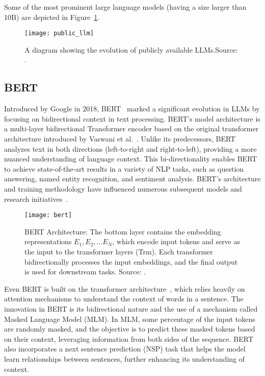 Some of the most prominent large language models (having a size larger than 10B) are depicted in Figure~\ref{fig:llm-evolution}.

\begin{figure}[h!]
    \centering
    \texttt{[image: public\_llm]}
    \caption{A diagram showing the evolution of publicly available LLMs.Source: \protect\cite{survey}.}
    \label{fig:llm-evolution}
\end{figure}

\subsection{BERT}
\label{subsec:bert}

Introduced by Google in 2018, BERT~\cite{bert} marked a significant evolution in LLMs by focusing on bidirectional context in text processing.
BERT’s model architecture is a multi-layer bidirectional Transformer encoder based on the original transformer architecture introduced by Vaswani et al.~\cite{vaswani2023attention}.
Unlike its predecessors, BERT analyzes text in both directions (left-to-right and right-to-left), providing a more nuanced understanding of language context.
This bi-directionality enables BERT to achieve state-of-the-art results in a variety of NLP tasks, such as question answering, named entity recognition, and sentiment analysis.
BERT's architecture and training methodology have influenced numerous subsequent models and research initiatives~\cite{bert}.

\begin{figure}[h!]
    \centering
    \texttt{[image: bert]}
    \caption{BERT Architecture: The bottom layer contains the embedding representations \(E_1, E_2, \ldots E_N\), which encode input tokens and serve as the input to the transformer layers (Trm).
    Each transformer bidirectionally processes the input embeddings, and the final output is used for downstream tasks. Source: \protect\cite{bert}.}
    \label{fig:bert-arch}
\end{figure}

Even BERT is built on the transformer architecture~\cite{vaswani2023attention}, which relies heavily on attention mechanisms to understand the context of words in a sentence.
The innovation in BERT is its bidirectional nature and the use of a mechanism called Masked Language Model (MLM). In MLM, some percentage of the input tokens are randomly masked, and the objective is to predict these masked tokens based on their context, leveraging information from both sides of the sequence.
BERT also incorporates a next sentence prediction (NSP) task that helps the model learn relationships between sentences, further enhancing its understanding of context.

